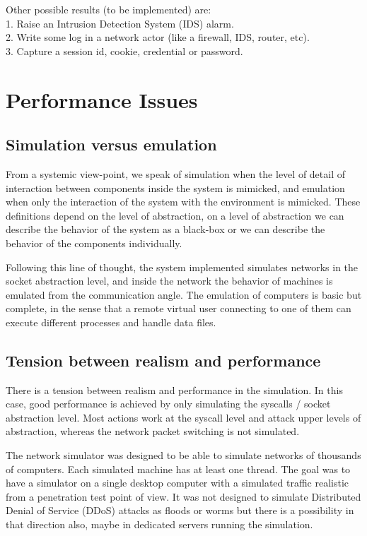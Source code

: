 \documentclass{llncs}
\begin{document}
Other possible results (to be implemented) are: \\
1. Raise an Intrusion Detection System (IDS) alarm. \\
2. Write some log in a network actor (like a firewall, IDS, router, etc).  \\
3. Capture a session id, cookie, credential or password.



\section{Performance Issues} \label{performance}



\subsection{Simulation versus emulation}

From a systemic view-point, 
we speak of simulation when the level of detail of interaction between components 
inside the system is mimicked, and emulation when only the interaction of the system 
with the environment is mimicked. 
These definitions depend on the level of abstraction, 
on a level of abstraction we can describe the behavior of the system as a black-box 
or we can describe the behavior of the components individually.

Following this line of thought, the system implemented simulates networks in the socket abstraction level, 
and inside the network the behavior of machines is emulated from the communication angle.
The emulation of computers is basic but complete, in the sense that a remote virtual user  
connecting to one of them can execute different processes and handle data files.


\subsection{Tension between realism and performance}
 
 There is a tension between realism and performance in the simulation. 
 In this case, good performance is achieved by only simulating the syscalls / socket abstraction level. 
Most actions work at the syscall level and attack upper levels of abstraction, 
whereas the network packet switching is not simulated.

The network simulator was designed to be able to simulate networks of thousands of computers. 
Each simulated machine has at least one thread. 
The goal was to have a simulator on a single desktop computer with a simulated traffic realistic 
from a penetration test point of view. It was not designed to simulate Distributed Denial of Service (DDoS) attacks as floods or worms 
but there is a possibility in that direction also, maybe in dedicated servers running the simulation.
\end{document}
